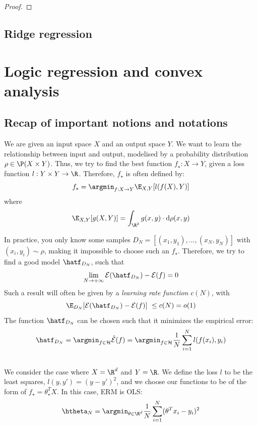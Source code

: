 \documentclass[toc]{../cs-classes/cs-classes}
\begin{document}
\begin{proof}
\end{proof}

\subsection{Ridge regression}

\section{Logic regression and convex analysis}
\subsection*{Recap of important notions and notations}
We are given an input space $X$ and an output space $Y$. We want to learn the relationship between input and output, modelised by a probability distribution $\rho\in \P(X\times Y)$. Thus, we try to find the best function $f_\star:X\to Y$, given a loss function $l:Y\times Y\to\R$. Therefore, $f_\star$ is often defined by:
\begin{equation*}
    f_\star = \argmin_{f:X\to Y} \E_{X, Y}[l(f(X), Y)]
\end{equation*}
where
\begin{equation*}
    \E_{X, Y}[g(X, Y)] = \int_{\R^2} g(x, y) \cdot \mathrm{d}\rho(x, y)
\end{equation*}

In practice, you only know some samples $D_N=[(x_1, y_1), \dots, (x_N, y_N)]$ with $(x_i, y_i) \sim \rho$, making it impossible to choose such an $f_\star$. Therefore, we try to find a good model $\hatf_{D_N}$, such that
\begin{equation*}
    \lim_{N\to+\infty}\mathcal{E}(\hatf_{D_N}) - \mathcal{E}(f) = 0
\end{equation*}
Such a result will often be given by a \emph{learning rate function} $c(N)$, with
\begin{equation*}
    \E_{D_N}[\mathcal{E}(\hatf_{D_N}) - \mathcal{E}(f)] \leq c(N) = o(1)
\end{equation*}
The function $\hatf_{D_N}$ can be chosen such that it minimizes the empirical error:
\begin{equation*}
    \hatf_{D_N} = \argmin_{f\in\mathcal{H}}\hat{\mathcal{E}}(f) = \argmin_{f\in\mathcal{H}} \frac{1}{N} \sum_{i=1}^N l(f(x_i), y_i)
\end{equation*}

\subsection{}
We consider the case where $X=\R^d$ and $Y=\R$. We define the loss $l$ to be the least squares, $l(y, y') = (y-y')^2$, and we choose our functions to be of the form of $f_\star = \theta_\star^T X$. In this case, ERM is OLS:
\begin{equation*}
    \htheta_N = \argmin_{\theta\in\R^d} \frac{1}{N} \sum_{i=1}^N (\theta^Tx_i-y_i)^2
\end{equation*}
\end{document}
